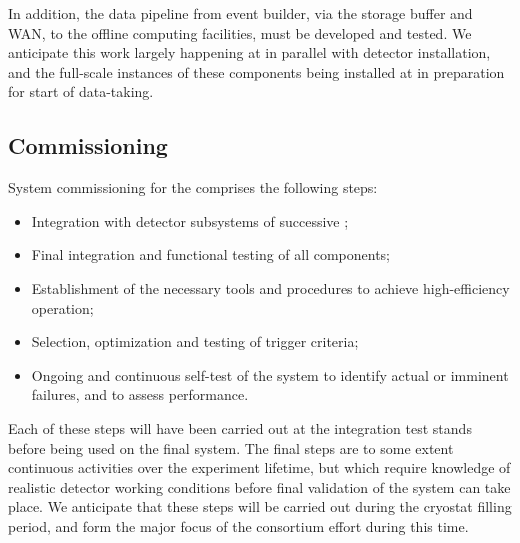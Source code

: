 In addition, the data pipeline from event builder, via the storage buffer and WAN, to the offline computing facilities, must be developed and tested. We anticipate this work largely happening at \fnal in parallel with detector installation, and the full-scale instances of these components being installed at \surf in preparation for start of data-taking.

\subsection{Commissioning}
\label{sec:fdsp-daq-commissioning}

System commissioning for the  comprises the following steps:

\begin{itemize}
	\item Integration with detector subsystems of successive ;
	\item Final integration and functional testing of all  components;
	\item Establishment of the necessary tools and procedures to achieve high-efficiency operation;
	\item Selection, optimization and testing of trigger criteria;
	\item Ongoing and continuous self-test of the system to identify actual or imminent failures, and to assess performance.
\end{itemize}

Each of these steps will have been carried out at the integration test stands before being used on the final system. The final steps are to some extent continuous activities over the experiment lifetime, but which require knowledge of realistic detector working conditions before final validation of the system can take place. We anticipate that these steps will be carried out during the cryostat filling period, and form the major focus of the  consortium effort during this time.
